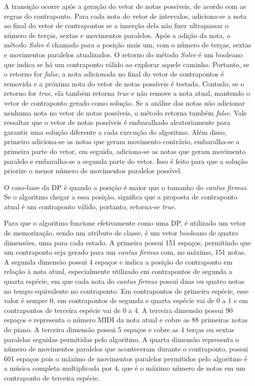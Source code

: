     A transição ocorre após a geração do vetor de notas possíveis, de acordo com as regras do contraponto. Para cada nota do vetor de intervalos, adiciona-se a nota ao final do vetor de contrapontos se a inserção dela não fizer ultrapassar o número de terças, sextas e movimentos paralelos. Após a adição da nota, o método \textit{Solve} é chamado para a posição mais um, com o número de terças, sextas e movimentos paralelos atualizados. O retorno do método \textit{Solve} é um booleano que indica se há um contraponto válido ao explorar aquele caminho. Portanto, se o retorno for \textit{false}, a nota adicionada no final do vetor de contrapontos é removida e a próxima nota do vetor de notas possíveis é testada. Contudo, se o retorno for \textit{true}, ela também retorna \textit{true} e não remove a nota atual, mantendo o vetor de contraponto gerado como solução. Se a análise das notas não adicionar nenhuma nota no vetor de notas possíveis, o método retorna também \textit{false}. Vale ressaltar que o vetor de notas possíveis é embaralhado aleatoriamente para garantir uma solução diferente a cada execução do algoritmo. Além disso, primeiro adiciona-se as notas que geram movimento contrário, embaralha-se a primeira parte do vetor, em seguida, adiciona-se as notas que geram movimento paralelo e embaralha-se a segunda parte do vetor. Isso é feito para que a solução priorize o menor número de movimentos paralelos possível.

    O caso-base da DP é quando a posição é maior que o tamanho do \textit{cantus firmus}. Se o algoritmo chegar a essa posição, significa que a proposta de contraponto atual é um contraponto válido, portanto, retorna-se \textit{true}.

    Para que o algoritmo funcione efetivamente como uma DP, é utilizado um vetor de memorização, sendo um atributo de classe, é um vetor booleano de quatro dimensões, uma para cada estado. A primeira possui 151 espaços, permitindo que um contraponto seja gerado para um \textit{cantus firmus} com, no máximo, 151 notas. A segunda dimensão possui 4 espaços e indica a posição do contraponto em relação à nota atual, especialmente utilizado em contrapontos de segunda a quarta espécie, em que cada nota do \textit{cantus firmus} possui duas ou quatro notas no tempo equivalente no contraponto. Em contrapontos de primeira espécie, esse valor é sempre 0, em contrapontos de segunda e quarta espécie vai de 0 a 1 e em contrapontos de terceira espécie vai de 0 a 4. A terceira dimensão possui 90 espaços e representa o número MIDI da nota atual e cobre as 88 primeiras notas do piano. A terceira dimensão possui 5 espaços e cobre as 4 terças ou sextas paralelas seguidas permitidas pelo algoritmo. A quarta dimensão representa o número de movimentos paralelos que aconteceram durante o contraponto, possui 601 espaços pois o máximo de movimentos paralelos permitidos pelo algoritmo é a música completa multiplicada por 4, que é o máximo número de notas em um contraponto de terceira espécie.


